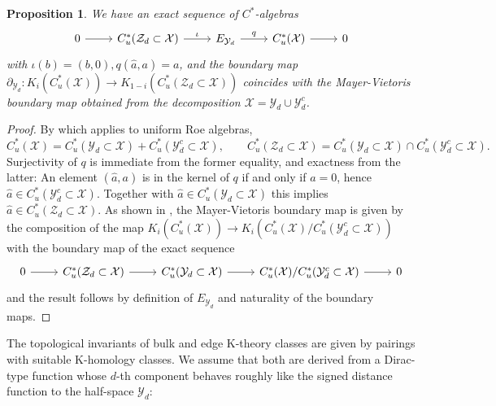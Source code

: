 \documentclass[12pt]{amsart}
\newtheorem{proposition}[theorem]{Proposition}
\newcommand{\Xx}{{\mathcal X}}
\newcommand{\Yy}{{\mathcal Y}}
\newcommand{\Zz}{{\mathcal Z}}
\newcommand{\pdv}{\partial}
\begin{document}
\begin{proposition}
We have an exact sequence of $C^*$-algebras
\begin{equation}
\label{eq:bulk_edge_exact}
	\begin{tikzcd}
		0 \arrow[r] & C^*_u(\Zz_d\subset \Xx) \arrow["\iota", r]  & E_{\Yy_d} \arrow["q", r]  & C^*_u(\Xx)   \arrow[r] & 0 
    \end{tikzcd}
\end{equation}
with $\iota(b)=(b,0), q(\hat{a},a)=a$, and the boundary map $\pdv_{\Yy_d}: K_i(C^*_u(\Xx)) \to K_{1-i}(C^*_u(\Zz_d\subset \Xx))$ coincides with the Mayer-Vietoris boundary map obtained from the decomposition $\Xx=\Yy_d \cup \Yy_d^c$.
\end{proposition}
\begin{proof}
By \cite[Lemma 2]{HigsonRoeYu1993} which applies to uniform Roe algebras,
\[C^*_u(\Xx)=C^*_u(\Yy_d\subset\Xx)+C^*_u(\Yy_d^c\subset\Xx), \qquad C_u^*(\Zz_d\subset \Xx)= C^*_u(\Yy_d\subset \Xx)\cap C^*_u(\Yy^c_d\subset \Xx).\]
Surjectivity of $q$ is immediate from the former equality, and exactness from the latter: An element $(\hat{a},a)$ is in the kernel of $q$ if and only if $a=0$, hence $\hat{a} \in C^*_u(\Yy^c_d\subset \Xx)$. Together with $\hat{a}\in C^*_u(\Yy_d\subset \Xx)$ this implies $\hat{a}\in C_u^*(\Zz_d\subset \Xx)$. As shown in \cite{EwertMeyer}, the Mayer-Vietoris boundary map is given by the composition of the map $K_i(C^*_u(\Xx))\to K_i(C^*_u(\Xx)/C^*_u(\Yy^c_d\subset \Xx))$ with the boundary map of the exact sequence
\begin{equation*}
	\begin{tikzcd}
		0 \arrow[r] & C^*_u(\Zz_d\subset \Xx) \arrow[r]  &  C^*_u(\Yy_d\subset \Xx) \arrow[r]  & C^*_u(\Xx)/C^*_u(\Yy^c_d\subset \Xx)   \arrow[r] & 0 
    \end{tikzcd}
\end{equation*}
and the result follows by definition of $E_{\Yy_d}$ and naturality of the boundary maps.
\end{proof} 

The topological invariants of bulk and edge K-theory classes are given by pairings with suitable K-homology classes. We assume that both are derived from a Dirac-type function whose $d$-th component behaves roughly like the signed distance function to the half-space $\Yy_d$:
\end{document}
